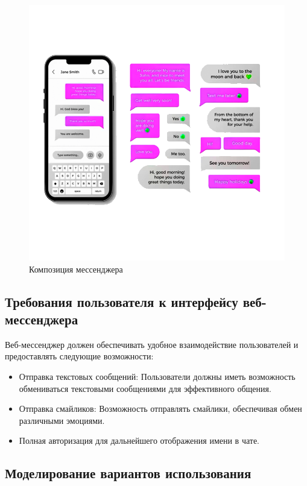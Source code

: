 \begin{enumerate}
\begin{figure}[H]
	\centering
	\includegraphics[width=0.7\linewidth]{images/komp_messenger}
	\caption{Композиция мессенджера}
	\label{fig:kompmessenger}
\end{figure}

\subsection{Требования пользователя к интерфейсу веб-мессенджера}

Веб-мессенджер должен обеспечивать удобное взаимодействие пользователей и предоставлять следующие возможности:
\begin{itemize}
	\item Отправка текстовых сообщений: Пользователи должны иметь возможность обмениваться текстовыми сообщениями для эффективного общения.
	\item Отправка смайликов: Возможность отправлять смайлики, обеспечивая обмен различными эмоциями.
	\item Полная авторизация для дальнейшего отображения имени в чате.
\end{itemize}


\subsection{Моделирование вариантов использования}

\end{enumerate}
